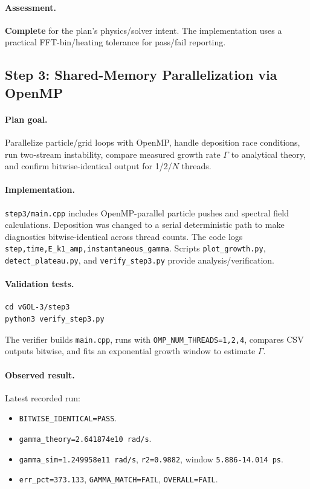 \documentclass[11pt,a4paper]{article}
\begin{document}
\paragraph{Assessment.}
\textbf{Complete} for the plan's physics/solver intent. The implementation uses a practical FFT-bin/heating tolerance for pass/fail reporting.

\subsection{Step 3: Shared-Memory Parallelization via OpenMP}

\paragraph{Plan goal.}
Parallelize particle/grid loops with OpenMP, handle deposition race conditions, run two-stream instability, compare measured growth rate $\Gamma$ to analytical theory, and confirm bitwise-identical output for 1/2/$N$ threads.

\paragraph{Implementation.}
\texttt{step3/main.cpp} includes OpenMP-parallel particle pushes and spectral field calculations. Deposition was changed to a serial deterministic path to make diagnostics bitwise-identical across thread counts. The code logs \texttt{step,time,E\_k1\_amp,instantaneous\_gamma}. Scripts \texttt{plot\_growth.py}, \texttt{detect\_plateau.py}, and \texttt{verify\_step3.py} provide analysis/verification.

\paragraph{Validation tests.}
\begin{lstlisting}
cd vGOL-3/step3
python3 verify_step3.py
\end{lstlisting}
The verifier builds \texttt{main.cpp}, runs with \texttt{OMP\_NUM\_THREADS=1,2,4}, compares CSV outputs bitwise, and fits an exponential growth window to estimate $\Gamma$.

\paragraph{Observed result.}
Latest recorded run:
\begin{itemize}[leftmargin=*]
  \item \texttt{BITWISE\_IDENTICAL=PASS}.
  \item \texttt{gamma\_theory=2.641874e10 rad/s}.
  \item \texttt{gamma\_sim=1.249958e11 rad/s}, \texttt{r2=0.9882}, window \texttt{5.886-14.014 ps}.
  \item \texttt{err\_pct=373.133}, \texttt{GAMMA\_MATCH=FAIL}, \texttt{OVERALL=FAIL}.
\end{itemize}
\end{document}
